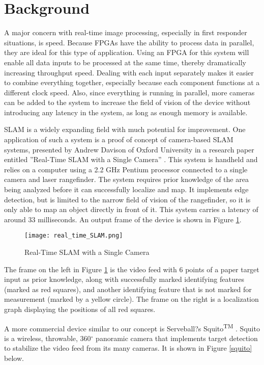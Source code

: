 \section{Background}
A major concern with real-time image processing, especially in first responder situations, is speed. Because FPGAs have the ability to process data in parallel, they are ideal for this type of application. Using an FPGA for this system will enable all data inputs to be processed at the same time, thereby dramatically increasing throughput speed. Dealing with each input separately makes it easier to combine everything together, especially because each component functions at a different clock speed. Also, since everything is running in parallel, more cameras can be added to the system to increase the field of vision of the device without introducing any latency in the system, as long as enough memory is available.
\par
SLAM is a widely expanding field with much potential for improvement. One application of such a system is a proof of concept of camera-based SLAM systems, presented by Andrew Davison of Oxford University in a research paper entitled ''Real-Time SLAM with a Single Camera'' \cite{davison}. This system is handheld and relies on a computer using a 2.2 GHz Pentium processor connected to a single camera and laser rangefinder. The system requires prior knowledge of the area being analyzed before it can successfully localize and map. It implements edge detection, but is limited to the narrow field of vision of the rangefinder, so it is only able to map an object directly in front of it. This system carries a latency of around 33 milliseconds. An output frame of the device is shown in Figure \ref{rtSLAM}.

\begin{figure}[H]
	\centerline{\texttt{[image: real\_time\_SLAM.png]}}
	\caption{Real-Time SLAM with a Single Camera \cite{davison}}
	\label{rtSLAM}
\end{figure}

The frame on the left in Figure \ref{rtSLAM} is the video feed with 6 points of a paper target input as prior knowledge, along with successfully marked identifying features (marked as red squares), and another identifying feature that is not marked for measurement (marked by a yellow circle). The frame on the right is a localization graph displaying the positions of all red squares.
\par
A more commercial device similar to our concept is Serveball?s Squito\textsuperscript{TM} \cite{serveball}. Squito is a wireless, throwable, 360$^{\circ}$ panoramic camera that implements target detection to stabilize the video feed from its many cameras. It is shown in Figure \ref{squito} below.

